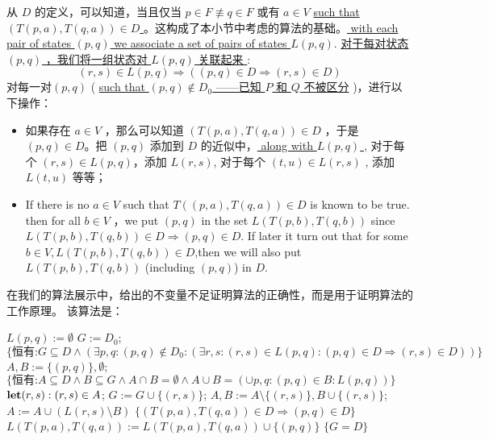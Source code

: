 从 $D$ 的定义，可以知道，当且仅当 $p \in F \not\equiv q \in F$ 或有 $a\in V$ \uline{such that $(T(p,a),T(q,a)) \in D$ }。这构成了本小节中考虑的算法的基础。\uline{ with each pair of states $(p,q)$ we associate a set of pairs of states $L(p,q)$}. 
\uline{ 对于每对状态 $(p,q)$ ，我们将一组状态对 $L(p,q)$ 关联起来 }:
$$ (r,s) \in L(p,q) \Rightarrow ((p,q) \in D \Rightarrow (r,s) \in D) $$
对每一对$(p,q)$ ( \uline{such that $ (p,q) \not\in D_0 $ ——已知 $P$ 和 $Q$ 不被区分} )，进行以下操作：

\begin{itemize}
    \item 如果存在 $a\in V$ ，那么可以知道 $ ( T(p,a), T(q,a) )  \in D $ ，于是 $ (p,q) \in D $。把 $( p,q )$ 添加到 $D$ 的近似中，\uline{ along with $ L(p,q) $ }, 对于每个 $ (r,s) \in L(p,q) $，添加 $ L(r,s) $, 对于每个 $ (t,u) \in L(r,s) $ , 添加 $ L(t,u) $ 等等；
    \item If there is no $a \in V$ such that $ T((p,a),T(q,a)) \in D $ is known to be true. then for all $ b\in V$ ，we put $ (p,q) $ in the set $ L( T(p,b),T (q,b) ) $ since $ L( T(p,b),T (q,b) ) \in D \Rightarrow (p,q) \in D $. If later it turn out that for some $ b \in V , L( T(p,b),T (q,b) ) \in D$,then we will also put $ L( T(p,b),T (q,b) ) $ (including $ (p,q) $) in $D$.
\end{itemize}
在我们的算法展示中，给出的不变量不足证明算法的正确性，而是用于证明算法的工作原理。 该算法是：

\begin{algorithm}
    \caption{}\label{al:4-7}
    \small
    \begin{algorithmic}[1]
            \State $ L(p,q) := \emptyset $ 
        \EndFor
        \State $G:=D_0$; 
        \State $\{ \mbox{恒有:} G \subseteq D \land ( \exists p,q:(p,q)\not\in D_0:(\exists r,s:(r,s)\in L(p,q):(p,q)\in D\Rightarrow (r,s)\in D ))\}$
                \State $A,B:=\{  (p,q) \}, \emptyset  $;
                \State $ \{ \mbox{恒有:} A \subseteq D \land B \subseteq G \land A \cap B = \emptyset \land A \cup B = ( \cup p,q:(p,q) \in B : L(p,q) ) \} $
                    \State $ \mbox{\textbf{let}} (r,s):(r,s) \in A $;
                    \State $ G:=G\cup \{ (r,s) \} $; 
                    \State $ A,B := A \setminus \{ (r,s) \}, B \cup \{ (r,s) \} $;
                    \State $ A := A \cup ( L(r,s) \setminus B ) $ 
                \Until
                    \State $ \{ (T(p,a),T(q,a)) \in D  \Rightarrow (p,q) \in D \} $
                    \State $ L( T(p,a),T(q,a) ) := L( T(p,a),T(q,a) ) \cup \{ (p,q)\} $
                \EndFor
            \EndIf
        \EndFor $\{ G=D \} $
    \end{algorithmic}
\end{algorithm}

